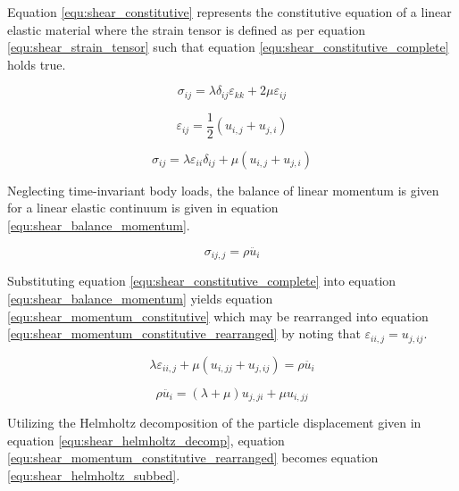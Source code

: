 			Equation \ref{equ:shear_constitutive} represents the constitutive equation of a linear elastic material where the strain tensor is defined as per equation \ref{equ:shear_strain_tensor} such that equation \ref{equ:shear_constitutive_complete} holds true.

			\begin{equation}
				\label{equ:shear_constitutive}
				\sigma_{ij} = \lambda \delta_{ij} \varepsilon_{kk} + 2 \mu \varepsilon_{ij}
			\end{equation}

			\begin{equation}
				\label{equ:shear_strain_tensor}
				\varepsilon_{ij} = \frac{1}{2}\left(u_{i,j} + u_{j,i}\right)
			\end{equation}

			\begin{equation}
				\label{equ:shear_constitutive_complete}
				\sigma_{ij} = \lambda \varepsilon_{ii} \delta_{ij} + \mu \left(u_{i,j} + u_{j,i}\right)
			\end{equation}

			Neglecting time-invariant body loads, the balance of linear momentum is given for a linear elastic continuum is given in equation \ref{equ:shear_balance_momentum}.

			\begin{equation}
				\label{equ:shear_balance_momentum}
				\sigma_{ij,j} = \rho \ddot{u_i}
			\end{equation}

			Substituting equation \ref{equ:shear_constitutive_complete} into equation \ref{equ:shear_balance_momentum} yields equation \ref{equ:shear_momentum_constitutive} which may be rearranged into equation \ref{equ:shear_momentum_constitutive_rearranged} by noting that $\varepsilon_{ii,j} = u_{j,ij}$.

			\begin{equation}
				\label{equ:shear_momentum_constitutive}
				\lambda \varepsilon_{ii,j} + \mu\left(u_{i,jj} + u_{j,ij}\right) = \rho \ddot{u_i}
			\end{equation}

			\begin{equation}
				\label{equ:shear_momentum_constitutive_rearranged}
				\rho \ddot{u_i} = \left(\lambda + \mu\right)u_{j,ji} + \mu u_{i,jj}
			\end{equation}

			Utilizing the Helmholtz decomposition of the particle displacement given in equation \ref{equ:shear_helmholtz_decomp}, equation \ref{equ:shear_momentum_constitutive_rearranged} becomes equation \ref{equ:shear_helmholtz_subbed}.


